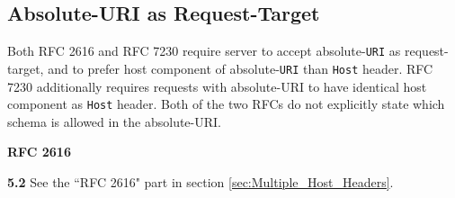 \subsection{Absolute-URI as Request-Target}
Both RFC 2616 and RFC 7230 require server to accept absolute-\texttt{URI} as request-target, and to prefer host component of absolute-\texttt{URI} than \texttt{Host} header. RFC 7230 additionally requires requests with absolute-URI to have identical host component as \texttt{Host} header. Both of the two RFCs do not explicitly state which schema is allowed in the absolute-URI.

\textbf{RFC 2616}
\columnseprule=1pt    %
\begin{multicols}{2}
	\begin{spacing}{0.8}
		\textbf{5.2} 
		{\footnotesize See the ``RFC 2616" part in section \ref{sec:Multiple_Host_Headers}.}
	\end{spacing}
\end{multicols}

